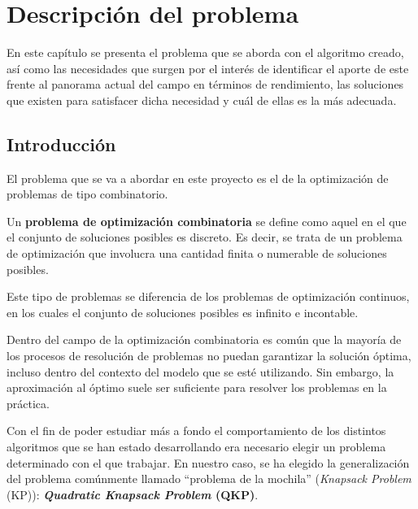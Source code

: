 \chapter{Descripción del problema}

En este capítulo se presenta el problema que se aborda con el algoritmo creado, así como las necesidades que surgen por el interés de identificar el aporte de este frente al panorama actual del campo en términos de rendimiento, las soluciones que existen para satisfacer dicha necesidad y cuál de ellas es la más adecuada.

\section{Introducción}

El problema que se va a abordar en este proyecto es el de la optimización de problemas de tipo combinatorio. 

\begin{definicion}
Un \textbf{problema de optimización combinatoria} se define como aquel en el que el conjunto de soluciones posibles es discreto. 
Es decir, se trata de un problema de optimización que involucra una cantidad finita o numerable de soluciones posibles.
\end{definicion}
Este tipo de problemas se diferencia de los problemas de optimización continuos, en los cuales el conjunto de soluciones posibles es infinito e incontable. 

Dentro del campo de la optimización combinatoria es común que la mayoría de los procesos de resolución de problemas no puedan garantizar la solución óptima, incluso dentro del contexto del modelo que se esté utilizando. 
Sin embargo, la aproximación al óptimo suele ser suficiente para resolver los problemas en la práctica. 

Con el fin de poder estudiar más a fondo el comportamiento de los distintos algoritmos que se han estado desarrollando era necesario elegir un problema determinado con el que trabajar. 
En nuestro caso, se ha elegido la generalización del problema comúnmente llamado ``problema de la mochila'' (\textit{Knapsack Problem} (KP)):  \textbf{\textit{Quadratic Knapsack Problem} (QKP)}. 

